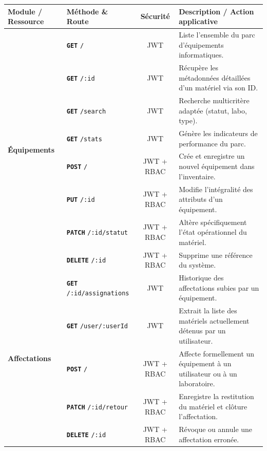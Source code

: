 \begin{table}[H]
\centering
\small
\begin{tabularx}{\textwidth}{|l|l|c|X|}
\hline
\textbf{Module / Ressource} & \textbf{Méthode \& Route} & \textbf{Sécurité} & \textbf{Description / Action applicative} \\ \hline
\multirow{8}{*}{\textbf{Équipements}} 
 & \textbf{\texttt{GET}} \texttt{/} & JWT & Liste l'ensemble du parc d'équipements informatiques. \\ \cline{2-4} 
 & \textbf{\texttt{GET}} \texttt{/:id} & JWT & Récupère les métadonnées détaillées d'un matériel via son ID. \\ \cline{2-4} 
 & \textbf{\texttt{GET}} \texttt{/search} & JWT & Recherche multicritère adaptée (statut, labo, type). \\ \cline{2-4} 
 & \textbf{\texttt{GET}} \texttt{/stats} & JWT & Génère les indicateurs de performance du parc. \\ \cline{2-4} 
 & \textbf{\texttt{POST}} \texttt{/} & JWT + RBAC & Crée et enregistre un nouvel équipement dans l'inventaire. \\ \cline{2-4} 
 & \textbf{\texttt{PUT}} \texttt{/:id} & JWT + RBAC & Modifie l'intégralité des attributs d'un équipement. \\ \cline{2-4} 
 & \textbf{\texttt{PATCH}} \texttt{/:id/statut} & JWT + RBAC & Altère spécifiquement l'état opérationnel du matériel. \\ \cline{2-4} 
 & \textbf{\texttt{DELETE}} \texttt{/:id} & JWT + RBAC & Supprime une référence du système. \\ \hline
\multirow{5}{*}{\textbf{Affectations}} 
 & \textbf{\texttt{GET}} \texttt{/:id/assignations} & JWT & Historique des affectations subies par un équipement. \\ \cline{2-4} 
 & \textbf{\texttt{GET}} \texttt{/user/:userId} & JWT & Extrait la liste des matériels actuellement détenus par un utilisateur. \\ \cline{2-4} 
 & \textbf{\texttt{POST}} \texttt{/} & JWT + RBAC & Affecte formellement un équipement à un utilisateur ou à un laboratoire. \\ \cline{2-4} 
 & \textbf{\texttt{PATCH}} \texttt{/:id/retour} & JWT + RBAC & Enregistre la restitution du matériel et clôture l'affectation. \\ \cline{2-4} 
 & \textbf{\texttt{DELETE}} \texttt{/:id} & JWT + RBAC & Révoque ou annule une affectation erronée. \\ \hline

\end{tabularx}
\end{table}

